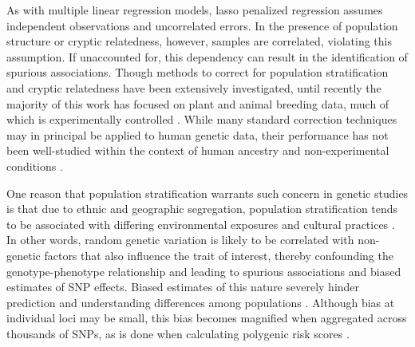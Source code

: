As with multiple linear regression models, lasso penalized regression assumes independent observations and uncorrelated errors. In the presence of population structure or cryptic relatedness, however, samples are correlated, violating this assumption. If unaccounted for, this dependency can result in the identification of spurious associations. Though methods to correct for population stratification and cryptic relatedness have been extensively investigated, until recently the majority of this work has focused on plant and animal breeding data, much of which is experimentally controlled \citep{Amin2007, hoffman2013correcting, price2006principal, Rakitsch2012, bhatnagar2019simultaneous, Sillanpaeae2011}. While many standard correction techniques may in principal be applied to human genetic data, their performance has not been well-studied within the context of human ancestry and non-experimental conditions \citep{lawson2019population, barton2019population}.  

One reason that population stratification warrants such concern in genetic studies is that due to ethnic and geographic segregation, population stratification tends to be associated with differing environmental exposures and cultural practices \citep{thornton2015statistical, browning2011population}.  In other words, random genetic variation is likely to be correlated with non-genetic factors that also influence the trait of interest, thereby confounding the genotype-phenotype relationship and leading to spurious associations and biased estimates of SNP effects. Biased estimates of this nature severely hinder prediction and understanding differences among populations \citep{barton2019population}. Although bias at individual loci may be small, this bias becomes magnified when aggregated across thousands of SNPs, as is done when calculating polygenic risk scores \citep{barton2019population, peterson2019genome}.

